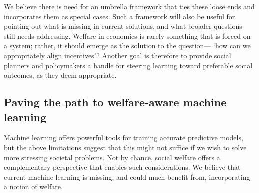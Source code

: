 We believe there is need for an umbrella framework that ties these loose ends and 
incorporates them as special cases.
Such a framework will also be useful for 
pointing out what is missing in current solutions,
and what broader questions still needs addressing.
Welfare in economics is rarely something that is forced on a system;
rather, it should emerge as the solution to the question---%
`how can we appropriately align incentives'?
Another goal is therefore to provide social planners and policymakers a handle 
for steering learning toward preferable social outcomes, as they deem appropriate.











\subsection{Paving the path to welfare-aware machine learning}

Machine learning offers powerful tools for training accurate predictive models,
but the above limitations suggest that this might not suffice if we wish to solve more stressing societal problems.
Not by chance, social welfare offers a complementary perspective that enables such considerations.
We believe that current machine learning is missing,
and could much benefit from, incorporating a notion of welfare.

